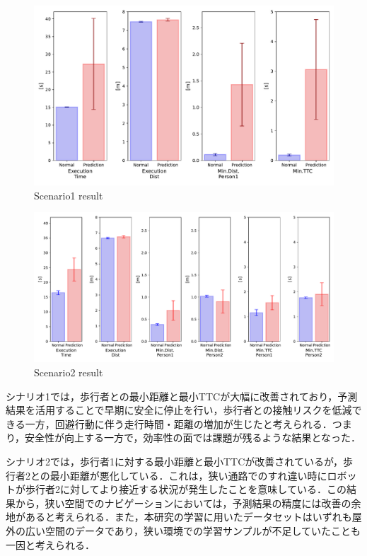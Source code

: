 \begin{figure}[H]
  \centering
 \includegraphics[keepaspectratio, scale=0.53]
      {images/scenario1_result.pdf}
  \caption{Scenario1 result}
 \label{Fig:scenario1-result}
\end{figure} 

\begin{figure}[H]
  \centering
 \includegraphics[keepaspectratio, scale=0.44]
      {images/scenario2_result.pdf}
  \caption{Scenario2 result}
 \label{Fig:scenario2-result}
\end{figure} 

\newpage

シナリオ1では，歩行者との最小距離と最小TTCが大幅に改善されており，予測結果を活用することで早期に安全に停止を行い，歩行者との接触リスクを低減できる一方，回避行動に伴う走行時間・距離の増加が生じたと考えられる．つまり，安全性が向上する一方で，効率性の面では課題が残るような結果となった．

シナリオ2では，歩行者1に対する最小距離と最小TTCが改善されているが，歩行者2との最小距離が悪化している．これは，狭い通路でのすれ違い時にロボットが歩行者2に対してより接近する状況が発生したことを意味している．この結果から，狭い空間でのナビゲーションにおいては，予測結果の精度には改善の余地があると考えられる．また，本研究の学習に用いたデータセットはいずれも屋外の広い空間のデータであり，狭い環境での学習サンプルが不足していたことも一因と考えられる．

